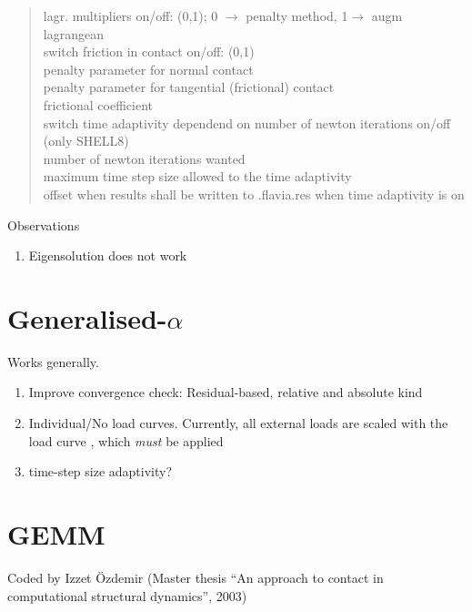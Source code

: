 \begin{quote}
lagr. multipliers on/off: (0,1); 0 $\to$ penalty method, 1$\to$ augm
lagrangean \\
 \chs switch friction in contact on/off: (0,1) \\
 \chs penalty parameter for normal contact \\
 \chs penalty parameter for tangential (frictional) contact \\
 \chs frictional coefficient \\
 \chs switch time adaptivity dependend on
number of newton iterations on/off (only SHELL8) \\
 \chs number of newton iterations wanted \\
 \chs maximum time step size allowed to the time adaptivity
\\
 \chs offset when results shall be written to .flavia.res when time adaptivity is on
\end{quote}

Observations
\begin{enumerate}
\item Eigensolution does not work
\end{enumerate}
\section{Generalised-$\alpha$}

Works generally.

\begin{enumerate}
\item Improve convergence check: Residual-based, relative and absolute kind
\item Individual/No load curves. Currently, all external loads are scaled with
  the load curve , which \emph{must} be applied
\item time-step size adaptivity?
\end{enumerate}

\section{GEMM}
Coded by Izzet \"{O}zdemir (Master thesis ``An approach to contact in
computational structural dynamics'', 2003)

